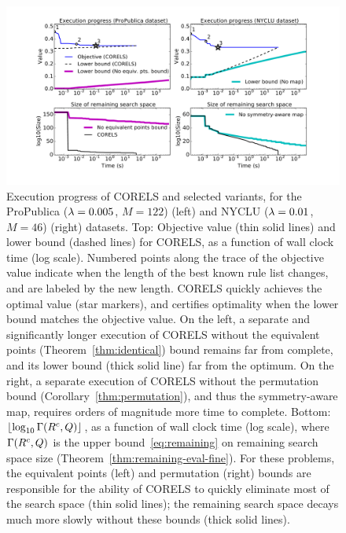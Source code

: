 \begin{figure}[t!]
\begin{center}
\includegraphics[trim={30mm, 20mm, 30mm, 20mm},
width=\textwidth]{figs/weapon_execution_large-remaining-space.pdf}
\end{center}
\caption{Execution progress of CORELS and selected variants,
for the ProPublica (${{\lambda} = 0.005}$, ${M = 122}$) (left)
and NYCLU (${{\lambda} = 0.01}$, ${M = 46}$) (right) datasets.
%
Top: Objective value (thin solid lines) and lower bound (dashed lines) for CORELS,
as a function of wall clock time (log scale).
%
Numbered points along the trace of the objective value
indicate when the length of the best known rule list changes,
and are labeled by the new length.
%
CORELS quickly achieves the optimal value (star markers),
and certifies optimality when the lower bound matches the objective value.
%
On the left, a separate and significantly longer execution of CORELS
without the equivalent points  (Theorem~\ref{thm:identical}) bound remains
far from complete, and its lower bound (thick solid line) far from the optimum.
%
On the right, a separate execution of CORELS without the permutation bound
(Corollary~\ref{thm:permutation}), and thus the symmetry-aware map,
requires orders of magnitude more time to complete.
%
Bottom: $\lfloor \log_{10} \Gamma({R^c}, Q) \rfloor$,
as a function of wall clock time (log scale),
where~$\Gamma({R^c}, Q)$
is the upper bound~\eqref{eq:remaining} on remaining search space size
(Theorem~\ref{thm:remaining-eval-fine}).
%
For these problems, the equivalent points (left) and
permutation (right) bounds are responsible for the ability of
CORELS to quickly eliminate most of the search space (thin solid lines);
the remaining search space decays much more slowly without these bounds (thick solid lines).
}
\label{fig:objective}
\end{figure}

